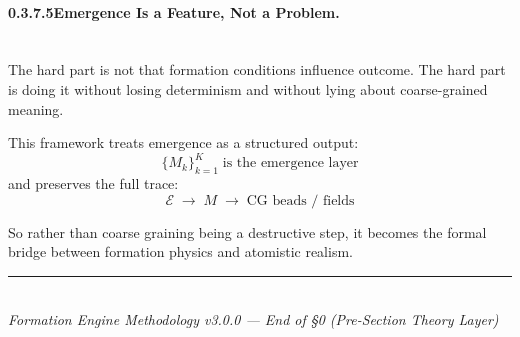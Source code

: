 \documentclass[11pt, a4paper, oneside]{article}
\theoremstyle{definition}
\theoremstyle{remark}
\begin{document}
\paragraph{0.3.7.5\quad Emergence Is a Feature, Not a Problem.}
\label{sec:emergence}
\mbox{}\\[0.4em]

The hard part is not that formation conditions influence outcome.
The hard part is doing it without losing determinism and without
lying about coarse-grained meaning.

This framework treats emergence as a structured output:
\[
  \{M_k\}_{k=1}^{K} \;\text{is the emergence layer}
\]
and preserves the full trace:
\begin{equation}
  \mathcal{E}
  \;\longrightarrow\;
  M
  \;\longrightarrow\;
  \text{CG beads / fields}
  \label{eq:emergence-trace}
\end{equation}

So rather than coarse graining being a destructive step, it becomes
the formal bridge between formation physics and atomistic realism.

\vfill
\begin{center}
  \rule{0.4\textwidth}{0.4pt}\\[0.5em]
  \textit{Formation Engine Methodology v3.0.0 —
          End of §0 (Pre-Section Theory Layer)}
\end{center}
\end{document}
